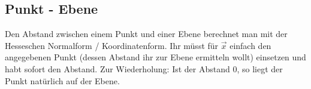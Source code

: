 \subsection{Punkt - Ebene}
	Den Abstand zwischen einem Punkt und einer Ebene berechnet man mit der
	Hesseschen Normalform / Koordinatenform. Ihr müsst für \(\vec{x}\) einfach den
	angegebenen Punkt (dessen Abstand ihr zur Ebene ermitteln wollt) einsetzen und
	habt sofort den Abstand. Zur Wiederholung:
	\formel{\[d=(\vec{a}-\vec{x})\cdot \hat{n} \mathrm{\ bzw\ }
	d=\frac{n_1x_1+n_2x_2+n_3x_3-w}{|\vec{n}|}\]}
	Ist der Abstand 0, so liegt der Punkt natürlich auf der Ebene.
